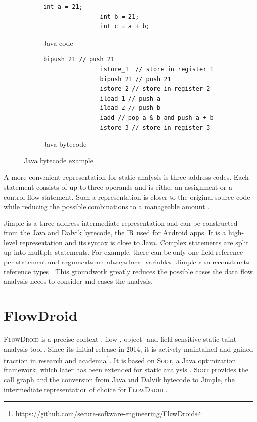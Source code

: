 \documentclass[../draft.tex]{subfiles}
\begin{document}
    \begin{figure}[ht]
        \centering
        \begin{subfigure}[b]{0.45\textwidth}
            \centering
            \begin{lstlisting}[gobble=16]
                int a = 21;
                int b = 21;
                int c = a + b;
            \end{lstlisting}
            \caption{Java code}
            \label{lst:jvmstack_a}
        \end{subfigure}
        \hfill
        \begin{subfigure}[b]{0.45\textwidth}
            \centering
            \begin{lstlisting}[gobble=16]
                bipush 21 // push 21
                istore_1  // store in register 1    
                bipush 21 // push 21
                istore_2 // store in register 2
                iload_1 // push a
                iload_2 // push b
                iadd // pop a & b and push a + b
                istore_3 // store in register 3
            \end{lstlisting}
            \caption{Java bytecode}
            \label{lst:jvmstack_b}
        \end{subfigure}
        \caption{Java bytecode example}
        \label{lst:jvmstack}
    \end{figure}

    A more convenient representation for static analysis is three-address codes. Each statement consists of up to three operands and is either an assignment or a control-flow statement. Such a representation is closer to the original source code while reducing the possible combinations to a manageable amount \cite{Aho1986}.

    Jimple is a three-address intermediate representation and can be constructed from the Java and Dalvik bytecode, the IR used for Android apps. It is a high-level representation and its syntax is close to Java. Complex statements are split up into multiple statements. For example, there can be only one field reference per statement and arguments are always local variables. Jimple also reconstructs reference types \cite{Valleerai2004}. This groundwork greatly reduces the possible cases the data flow analysis needs to consider and eases the analysis.

    \section{FlowDroid}\label{s:flowdroid}
    \textsc{FlowDroid} is a precise context-, flow-, object- and field-sensitive static taint analysis tool \cite{Arzt2014}. Since its initial release in 2014, it is actively maintained and gained traction in research and academia\footnote{\url{https://github.com/secure-software-engineering/FlowDroid}}. It is based on \textsc{Soot}, a Java optimization framework, which later has been extended for static analysis \cite{Lam2011}. \textsc{Soot} provides the call graph and the conversion from Java and Dalvik bytecode to Jimple, the intermediate representation of choice for \textsc{FlowDroid} \cite{Arzt2017PhD}.
\end{document}

